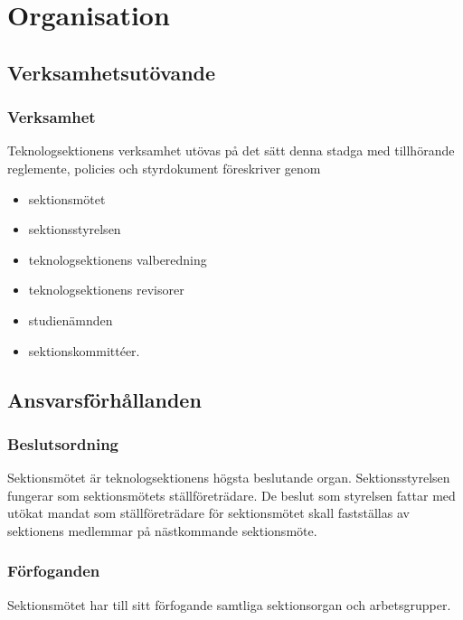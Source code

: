\section{Organisation}

\subsection{Verksamhetsutövande}

\subsubsection{Verksamhet}
Teknologsektionens verksamhet utövas på det sätt denna stadga med tillhörande reglemente, policies och styrdokument föreskriver genom

\begin{itemize}
	\item sektionsmötet
	\item sektionsstyrelsen \STYRIT{}
	\item teknologsektionens valberedning
	\item teknologsektionens revisorer
	\item studienämnden \SNIT{}
	\item sektionskommittéer.
\end{itemize}

\subsection{Ansvarsförhållanden}

\subsubsection{Beslutsordning}
Sektionsmötet är teknologsektionens högsta beslutande organ. Sektionsstyrelsen fungerar som sektionsmötets ställföreträdare. De beslut som styrelsen fattar med utökat mandat som ställföreträdare för sektionsmötet skall fastställas av sektionens medlemmar på nästkommande sektionsmöte.

\subsubsection{Förfoganden}
Sektionsmötet har till sitt förfogande samtliga sektionsorgan och arbetsgrupper.

